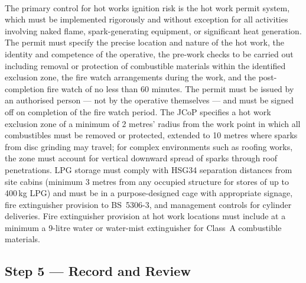 \paragraph{}
The primary control for hot works ignition risk is the hot work permit system, which must be implemented rigorously and without exception for all activities involving naked flame, spark-generating equipment, or significant heat generation. The permit must specify the precise location and nature of the hot work, the identity and competence of the operative, the pre-work checks to be carried out including removal or protection of combustible materials within the identified exclusion zone, the fire watch arrangements during the work, and the post-completion fire watch of no less than 60 minutes. The permit must be issued by an authorised person --- not by the operative themselves --- and must be signed off on completion of the fire watch period. The JCoP specifies a hot work exclusion zone of a minimum of 2 metres' radius from the work point in which all combustibles must be removed or protected, extended to 10 metres where sparks from disc grinding may travel; for complex environments such as roofing works, the zone must account for vertical downward spread of sparks through roof penetrations. LPG storage must comply with HSG34 separation distances from site cabins (minimum 3 metres from any occupied structure for stores of up to 400\,kg LPG) and must be in a purpose-designed cage with appropriate signage, fire extinguisher provision to BS~5306-3, and management controls for cylinder deliveries. Fire extinguisher provision at hot work locations must include at a minimum a 9-litre water or water-mist extinguisher for Class~A combustible materials.

\subsection{Step 5 --- Record and Review}

